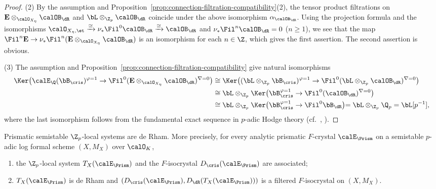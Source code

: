 \begin{proof}
(2) 
By the assumption and Proposition~\ref{prop:connection-filtration-compatibility}(2), 
the tensor product filtrations on $\mathbf{E} \otimes_{\calO_{X_\eta}}\calOB_{\dR}$ and $\bL\otimes_{\Z_p}\calOB_{\dR}$ coincide under the above isomorphism $\alpha_{ \calOB_{\dR}}$. Using the projection formula and the isomorphisms $\calO_{X_{\eta},\et}\xrightarrow{\cong}\nu_\ast\Fil^0\calOB_\dR\xrightarrow{\cong}\calOB_\dR$ and $\nu_\ast\Fil^n\calOB_\dR=0$ ($n\geq 1$), we see that the map $\Fil^n\mathbf{E}\rightarrow \nu_\ast\Fil^n(\mathbf{E} \otimes_{\calO_{X_\eta}}\calOB_{\dR})$ is an isomorphism for each $n\in\Z$, which gives the first assertion. The second assertion is obvious.

(3) The assumption and Proposition~\ref{prop:connection-filtration-compatibility} give natural isomorphisms
\begin{align*}
\Ker\bigl(\calE_\Q(\bB_{\cris})^{\varphi=1}\rightarrow \Fil^0(\mathbf{E}\otimes_{\calO_{X_\eta}}\calOB_\dR)^{\nabla=0}\bigl)
   &\cong \Ker\bigl((\bL\otimes_{\Z_p}\bB_\cris)^{\varphi=1}\rightarrow \Fil^0(\bL\otimes_{\Z_p}\calOB_{\dR})^{\nabla=0}\bigl)\\
&\cong \bL\otimes_{\Z_p}\Ker\bigl(\bB_\cris^{\varphi=1}\rightarrow \Fil^0(\calOB_{\dR})^{\nabla=0}\bigl)\\
&\cong \bL\otimes_{\Z_p}\Ker\bigl(\bB_\cris^{\varphi=1}\rightarrow \Fil^0\bB_{\dR}\bigl)=\bL\otimes_{\Z_p}\Q_p=\bL[p^{-1}],
\end{align*}
where the last isomorphism follows from the fundamental exact sequence in $p$-adic Hodge theory (cf.~\cite[Prop.~6.2.24]{brinon-relative}, \cite[Lem.~2.22(ii)]{GuoReinecke-Ccris}). 
\end{proof}


\begin{cor} \label{cor:prismatic-semistable-deRham-semistable-case}
Prismatic semistable $\Z_p$-local systems are de Rham. 
More precisely, for every analytic prismatic $F$-crystal $\calE_\Prism$ on a semistable $p$-adic log formal scheme $(X,M_X)$ over $\calO_K$,
\begin{enumerate}
    \item the $\Z_p$-local system $T_X(\calE_\Prism)$ and the $F$-isocrystal $D_\cris(\calE_\Prism)$ are associated;
    \item $T_X(\calE_\Prism)$ is de Rham and $(D_\cris(\calE_\Prism), D_\dR(T_X(\calE_\Prism)))$ is a filtered $F$-isocrystal on $(X,M_X)$.
 \end{enumerate}
\end{cor}

